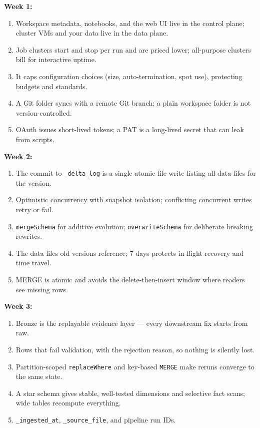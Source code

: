 \documentclass[11pt, a4paper]{article}
\begin{document}
\noindent\textbf{Week 1:}
\begin{enumerate}[itemsep=0pt, leftmargin=2em]
    \item Workspace metadata, notebooks, and the web UI live in the control plane; cluster VMs and your data live in the data plane.
    \item Job clusters start and stop per run and are priced lower; all-purpose clusters bill for interactive uptime.
    \item It caps configuration choices (size, auto-termination, spot use), protecting budgets and standards.
    \item A Git folder syncs with a remote Git branch; a plain workspace folder is not version-controlled.
    \item OAuth issues short-lived tokens; a PAT is a long-lived secret that can leak from scripts.
\end{enumerate}
\noindent\textbf{Week 2:}
\begin{enumerate}[itemsep=0pt, leftmargin=2em]
    \item The commit to \texttt{\_delta\_log} is a single atomic file write listing all data files for the version.
    \item Optimistic concurrency with snapshot isolation; conflicting concurrent writes retry or fail.
    \item \texttt{mergeSchema} for additive evolution; \texttt{overwriteSchema} for deliberate breaking rewrites.
    \item The data files old versions reference; 7 days protects in-flight recovery and time travel.
    \item MERGE is atomic and avoids the delete-then-insert window where readers see missing rows.
\end{enumerate}
\noindent\textbf{Week 3:}
\begin{enumerate}[itemsep=0pt, leftmargin=1.5em]
    \item Bronze is the replayable evidence layer --- every downstream fix starts from raw.
    \item Rows that fail validation, with the rejection reason, so nothing is silently lost.
    \item Partition-scoped \texttt{replaceWhere} and key-based \texttt{MERGE} make reruns converge to the same state.
    \item A star schema gives stable, well-tested dimensions and selective fact scans; wide tables recompute everything.
    \item \texttt{\_ingested\_at}, \texttt{\_source\_file}, and pipeline run IDs.
\end{enumerate}
\end{document}
